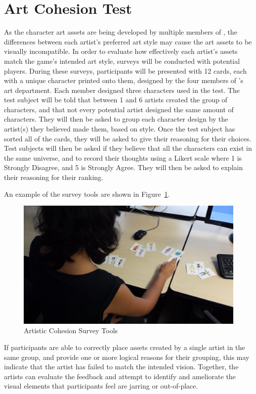 \section{Art Cohesion Test}
As the character art assets are being developed by multiple members of \ourteam{}, the differences between each artist's preferred art style may cause the art assets to be visually incompatible. In order to evaluate how effectively each artist's assets match the game's intended art style, surveys will be conducted with potential players. During these surveys, participants will be presented with 12 cards, each with a unique character printed onto them, designed by the four members of \ourteam{}'s art department. Each member designed three characters used in the test. The test subject will be told that between 1 and 6 artists created the group of characters, and that not every potential artist designed the same amount of characters. They will then be asked to group each character design by the artist(s) they believed made them, based on style. Once the test subject has sorted all of the cards, they will be asked to give their reasoning for their choices. Test subjects will then be asked if they believe that all the characters can exist in the same universe, and to record their thoughts using a Likert scale where 1 is Strongly Disagree, and 5 is Strongly Agree. They will then be asked to explain their reasoning for their ranking.

An example of the survey tools are shown in Figure~\ref{fig:survey}.

\begin{figure}[htb]
\centering\includegraphics[width=.35\linewidth]{images/art_cohesion_test}
\caption{Artistic Cohesion Survey Tools}
\label{fig:survey}
\end{figure}

If participants are able to correctly place assets created by a single artist in the same group, and provide one or more logical reasons for their grouping, this may indicate that the artist has failed to match the intended vision. Together, the artists can evaluate the feedback and attempt to identify and ameliorate the visual elements that participants feel are jarring or out-of-place.